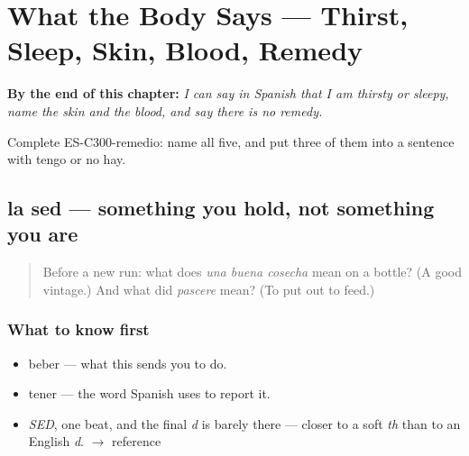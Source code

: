 
\chapter{What the Body Says --- Thirst, Sleep, Skin, Blood, Remedy}
\label{ch:el-cuerpo-dice}

\begin{chapteropening}
\textbf{By the end of this chapter:} \emph{I can say in Spanish that I am thirsty or sleepy, name the skin and the blood, and say there is no remedy.}

Complete ES-C300-remedio: name all five, and put three of them into a sentence with tengo or no hay.
\end{chapteropening}

\section[la sed]{la sed — something you hold, not something you are}

\label{lesson:ES-C300-sed}



\begin{quote}
Before a new run: what does \emph{una buena cosecha} mean on a bottle? (A good vintage.) And what did \emph{pascere} mean? (To put out to feed.)
\end{quote}

\subsection*{What to know first}
\begin{itemize}
\raggedright
  \item beber — what this sends you to do.
  \item tener — the word Spanish uses to report it.
\end{itemize}

\begin{sounds}
\begin{itemize}
\raggedright
  \item \emph{SED}, one beat, and the final \emph{d} is barely there — closer to a soft \emph{th} than to an English \emph{d}. $\to$ reference
\end{itemize}
\end{sounds}

